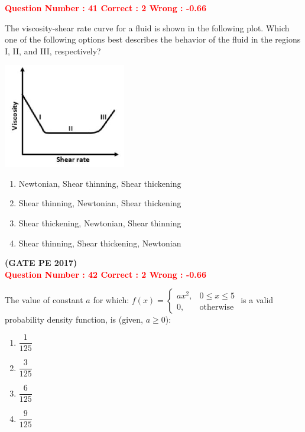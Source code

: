 \documentclass[journal,12pt,onecolumn]{article}
\begin{document}
{\newpage

\textcolor{red}{\textbf{Question Number : 41 \hfill Correct : 2  Wrong : -0.66}}

The viscosity-shear rate curve for a fluid is shown in the following plot. Which one of the following options best describes the behavior of the fluid in the regions I, II, and III, respectively?

\begin{center}
    \includegraphics[width=0.4\textwidth]{Figs/Graph_Q41.png}
\end{center}

\begin{enumerate}[label=(\Alph*)]
    \item Newtonian, Shear thinning, Shear thickening
    \item Shear thinning, Newtonian, Shear thickening
    \item Shear thickening, Newtonian, Shear thinning
    \item Shear thinning, Shear thickening, Newtonian
\end{enumerate}

\hfill\textbf{(GATE PE 2017)}\\[0.6cm]

\textcolor{red}{\textbf{Question Number : 42 \hfill Correct : 2  Wrong : -0.66}}

The value of constant $a$ for which:
{\LARGE$ 
f(x) = \begin{cases}
ax^2, & 0 \leq x \leq 5 \\
0, & \text{otherwise}
\end{cases}
$}
is a valid probability density function, is (given, $a \geq 0$):

\begin{enumerate}[label=(\Alph*)]
    \item $\dfrac{1}{125}$
    \item $\dfrac{3}{125}$
    \item $\dfrac{6}{125}$
    \item $\dfrac{9}{125}$
\end{enumerate}

}
\end{document}
